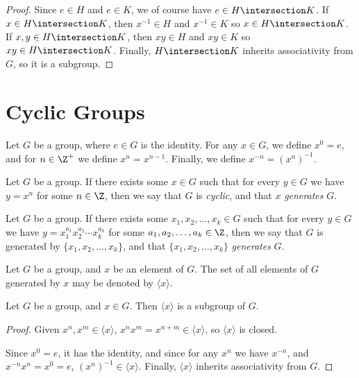 \documentclass[12pt]{article}
\begin{document}
\begin{proof}
    Since $e \in H$ and $e \in K$, we of course have $e \in H \intersection K$. If $x \in H \intersection K$, then $x^{-1} \in H$ and $x^{-1} \in K$ so $x \in H \intersection K$. If $x, y \in H \intersection K$, then $xy \in H$ and $xy \in K$ so $xy \in H \intersection K$. Finally, $H \intersection K$ inherits associativity from $G$, so it is a subgroup.
\end{proof}

\section{Cyclic Groups}

\begin{defn}
    Let $G$ be a group, where $e \in G$ is the identity. For any $x \in G$, we define $x^0 = e$, and for $n \in \Z^+$ we define $x^n = x^{n-1}$. Finally, we define $x^{-n} = \left(x^n\right)^{-1}$.
\end{defn}

\begin{defn}
    Let $G$ be a group. If there exists some $x \in G$ such that for every $y \in G$ we have $y = x^n$ for some $n \in \Z$, then we say that $G$ is \emph{cyclic}, and that $x$ \emph{generates} $G$.
\end{defn}

\begin{defn}
    Let $G$ be a group. If there exists some $x_1, x_2, \ldots, x_k \in G$ such that for every $y \in G$ we have $y = x_1^{a_1}x_2^{a_2}{\cdots}x_k^{a_k}$ for some $a_1, a_2, \ldots, a_k \in \Z$, then we say that $G$ is generated by $\{x_1, x_2, \ldots, x_k\}$, and that $\{x_1, x_2, \ldots, x_k\}$ \emph{generates} $G$.
\end{defn}

\begin{defn}
    Let $G$ be a group, and $x$ be an element of $G$. The set of all elements of $G$ generated by $x$ may be denoted by $\langle{x}\rangle$.
\end{defn}

\begin{prop}
    Let $G$ be a group, and $x \in G$. Then $\langle{x}\rangle$ is a subgroup of $G$.
\end{prop}

\begin{proof}
    Given $x^n, x^m \in \langle{x}\rangle$, $x^nx^m = x^{n+m} \in \langle{x}\rangle$, so $\langle{x}\rangle$ is closed.

    Since $x^0 = e$, it has the identity, and since for any $x^n$ we have $x^{-n}$, and $x^{-n}x^n = x^0 = e$, $\left(x^n\right)^{-1} \in \langle{x}\rangle$. Finally, $\langle{x}\rangle$ inherits associativity from $G$.
\end{proof}
\end{document}

